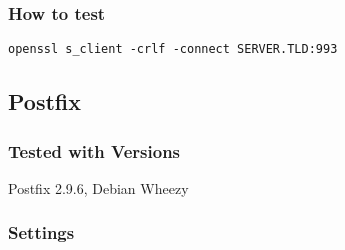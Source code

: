 \subsubsection{How to test}
\begin{lstlisting}
openssl s_client -crlf -connect SERVER.TLD:993
\end{lstlisting}



\subsection{Postfix}

\subsubsection{Tested with Versions}
\begin{itemize*}
  \item Postfix 2.9.6, Debian Wheezy
\end{itemize*}


\subsubsection{Settings}



